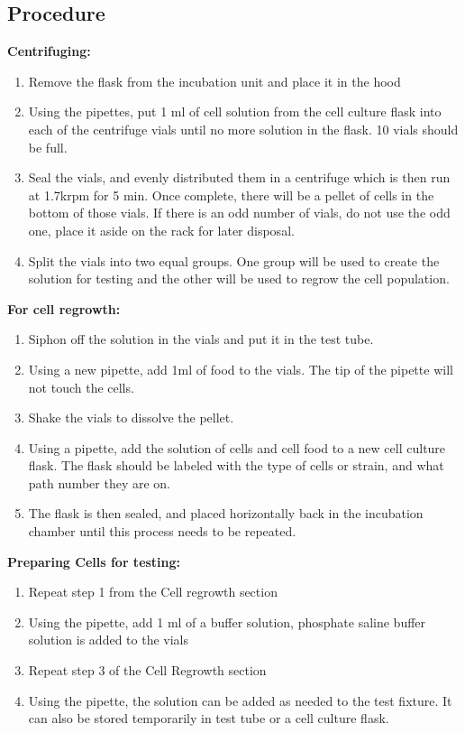 \documentclass[journal]{IEEEtran}
\begin{document}
\subsection{Procedure}

\textbf{Centrifuging:}
\begin{enumerate}
\item Remove the flask from the incubation unit and place it in the hood
\item Using the pipettes, put 1 ml of cell solution from the cell culture flask into each of the centrifuge vials until no more solution in the flask. 10 vials should be full.
\item Seal the vials, and evenly distributed them in a centrifuge which is then run at 1.7krpm for 5 min. Once complete, there will be a pellet of cells in the bottom of those vials. If there is an odd number of vials, do not use the odd one, place it aside on the rack for later disposal.
\item Split the vials into two equal groups. One group will be used to create the solution for testing and the other will be used to regrow the cell population.
\end{enumerate}

\textbf{For cell regrowth:}
\begin{enumerate}
\item Siphon off the solution in the vials and put it in the test tube. 
\item Using a new pipette, add 1ml of food to the vials. The tip of the pipette will not touch the cells.
\item Shake the vials to dissolve the pellet.
\item Using a pipette, add the solution of cells and cell food to a new cell culture flask. The flask should be labeled with the type of cells or strain, and what path number they are on.
\item The flask is then sealed, and placed horizontally back in the incubation chamber until this process needs to be repeated.
\end{enumerate}

\textbf{Preparing Cells for testing:}
\begin{enumerate}
\item Repeat step 1 from the Cell regrowth section
\item Using the pipette, add 1 ml of a buffer solution, phosphate saline buffer solution is added to the vials
\item Repeat step 3 of the Cell Regrowth section
\item Using the pipette, the solution can be added as needed to the test fixture. It can also be stored temporarily in test tube or a cell culture flask.
\end{enumerate}
\end{document}
